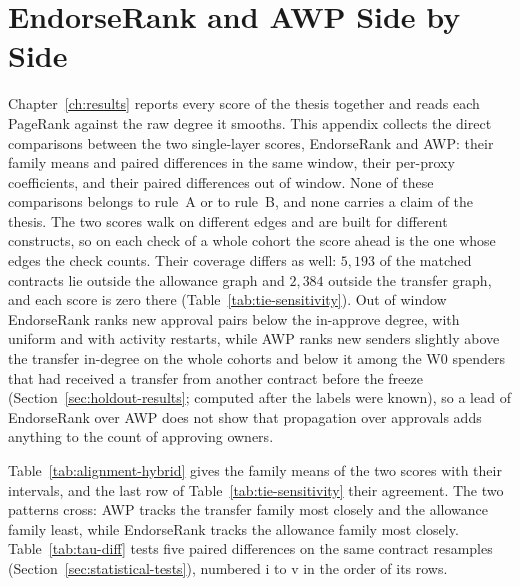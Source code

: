 \section{EndorseRank and AWP Side by Side}
\label{ch:appendix-er-awp}

Chapter~\ref{ch:results} reports every score of the thesis together and reads each PageRank against the raw degree it smooths. This appendix collects the direct comparisons between the two single-layer scores, EndorseRank and AWP: their family means and paired differences in the same window, their per-proxy coefficients, and their paired differences out of window. None of these comparisons belongs to rule~A or to rule~B, and none carries a claim of the thesis. The two scores walk on different edges and are built for different constructs, so on each check of a whole cohort the score ahead is the one whose edges the check counts. Their coverage differs as well: $5{,}193$ of the matched contracts lie outside the allowance graph and $2{,}384$ outside the transfer graph, and each score is zero there (Table~\ref{tab:tie-sensitivity}). Out of window EndorseRank ranks new approval pairs below the in-approve degree, with uniform and with activity restarts, while AWP ranks new senders slightly above the transfer in-degree on the whole cohorts and below it among the W0 spenders that had received a transfer from another contract before the freeze (Section~\ref{sec:holdout-results}; computed after the labels were known), so a lead of EndorseRank over AWP does not show that propagation over approvals adds anything to the count of approving owners.


Table~\ref{tab:alignment-hybrid} gives the family means of the two scores with their intervals, and the last row of Table~\ref{tab:tie-sensitivity} their agreement. The two patterns cross: AWP tracks the transfer family most closely and the allowance family least, while EndorseRank tracks the allowance family most closely. Table~\ref{tab:tau-diff} tests five paired differences on the same contract resamples (Section~\ref{sec:statistical-tests}), numbered i to v in the order of its rows.




